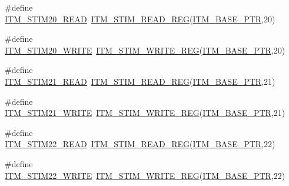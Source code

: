\begin{DoxyCompactItemize}
\item 
\#define \hyperlink{group___i_t_m___register___accessor___macros_gaec08b7ed3a53bdd0c49f608929a323ed}{I\+T\+M\+\_\+\+S\+T\+I\+M20\+\_\+\+R\+E\+AD}~\hyperlink{group___i_t_m___register___accessor___macros_ga5009882336aadcd4f37b45cf3395c450}{I\+T\+M\+\_\+\+S\+T\+I\+M\+\_\+\+R\+E\+A\+D\+\_\+\+R\+EG}(\hyperlink{group___i_t_m___peripheral_gafaddee8fe8b6a898d4e5edc43ee0d703}{I\+T\+M\+\_\+\+B\+A\+S\+E\+\_\+\+P\+TR},20)
\item 
\#define \hyperlink{group___i_t_m___register___accessor___macros_ga1e109dc4eb08a82ad21ba29f64b02976}{I\+T\+M\+\_\+\+S\+T\+I\+M20\+\_\+\+W\+R\+I\+TE}~\hyperlink{group___i_t_m___register___accessor___macros_ga049ca92a4e78e77c19af81e51aa73f1c}{I\+T\+M\+\_\+\+S\+T\+I\+M\+\_\+\+W\+R\+I\+T\+E\+\_\+\+R\+EG}(\hyperlink{group___i_t_m___peripheral_gafaddee8fe8b6a898d4e5edc43ee0d703}{I\+T\+M\+\_\+\+B\+A\+S\+E\+\_\+\+P\+TR},20)
\item 
\#define \hyperlink{group___i_t_m___register___accessor___macros_ga5e2870c6c2d38a75f0477a1030fc60aa}{I\+T\+M\+\_\+\+S\+T\+I\+M21\+\_\+\+R\+E\+AD}~\hyperlink{group___i_t_m___register___accessor___macros_ga5009882336aadcd4f37b45cf3395c450}{I\+T\+M\+\_\+\+S\+T\+I\+M\+\_\+\+R\+E\+A\+D\+\_\+\+R\+EG}(\hyperlink{group___i_t_m___peripheral_gafaddee8fe8b6a898d4e5edc43ee0d703}{I\+T\+M\+\_\+\+B\+A\+S\+E\+\_\+\+P\+TR},21)
\item 
\#define \hyperlink{group___i_t_m___register___accessor___macros_gac7f186c8addcf22a51326064a6775a33}{I\+T\+M\+\_\+\+S\+T\+I\+M21\+\_\+\+W\+R\+I\+TE}~\hyperlink{group___i_t_m___register___accessor___macros_ga049ca92a4e78e77c19af81e51aa73f1c}{I\+T\+M\+\_\+\+S\+T\+I\+M\+\_\+\+W\+R\+I\+T\+E\+\_\+\+R\+EG}(\hyperlink{group___i_t_m___peripheral_gafaddee8fe8b6a898d4e5edc43ee0d703}{I\+T\+M\+\_\+\+B\+A\+S\+E\+\_\+\+P\+TR},21)
\item 
\#define \hyperlink{group___i_t_m___register___accessor___macros_ga65cc639289ac0f598f937c573ed5abde}{I\+T\+M\+\_\+\+S\+T\+I\+M22\+\_\+\+R\+E\+AD}~\hyperlink{group___i_t_m___register___accessor___macros_ga5009882336aadcd4f37b45cf3395c450}{I\+T\+M\+\_\+\+S\+T\+I\+M\+\_\+\+R\+E\+A\+D\+\_\+\+R\+EG}(\hyperlink{group___i_t_m___peripheral_gafaddee8fe8b6a898d4e5edc43ee0d703}{I\+T\+M\+\_\+\+B\+A\+S\+E\+\_\+\+P\+TR},22)
\item 
\#define \hyperlink{group___i_t_m___register___accessor___macros_ga7733147e8939d83fbea163a3d3c181d4}{I\+T\+M\+\_\+\+S\+T\+I\+M22\+\_\+\+W\+R\+I\+TE}~\hyperlink{group___i_t_m___register___accessor___macros_ga049ca92a4e78e77c19af81e51aa73f1c}{I\+T\+M\+\_\+\+S\+T\+I\+M\+\_\+\+W\+R\+I\+T\+E\+\_\+\+R\+EG}(\hyperlink{group___i_t_m___peripheral_gafaddee8fe8b6a898d4e5edc43ee0d703}{I\+T\+M\+\_\+\+B\+A\+S\+E\+\_\+\+P\+TR},22)

\end{DoxyCompactItemize}

